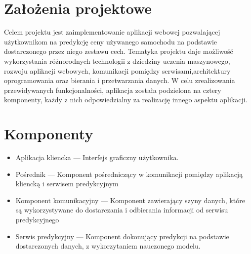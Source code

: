 \documentclass[12pt, a4paper]{report}
\begin{document}
\section{Założenia projektowe}
Celem projektu jest zaimplementowanie aplikacji webowej pozwalającej użytkownikom na predykcję 
ceny używanego samochodu na podstawie dostarczonego przez niego zestawu cech. Tematyka projektu
daje możliwość wykorzystania różnorodnych technologii z dziedziny uczenia maszynowego, rozwoju
aplikacji webowych, komunikacji pomiędzy serwisami,architektury oprogramowania oraz bierania i 
przetwarzania danych. W celu zrealizowania przewidywanych funkcjonalności, aplikacja została
podzielona na cztery komponenty, każdy z nich odpowiedzialny za realizację innego aspektu
aplikacji.
\section{Komponenty}
\begin{itemize}
    \item Aplikacja kliencka --- Interfejs graficzny użytkownika.
    \item Pośrednik --- Komponent pośredniczący w komunikacji pomiędzy aplikacją kliencką i serwisem predykcyjnym
    \item Komponent komunikacyjny --- Komponent zawierający szyny danych, które są wykorzystywane do dostarczania i odbierania informacji od serwisu predykcyjnego
    \item Serwis predykcyjny --- Komponent dokonujący predykcji na podstawie dostarczonych danych, z wykorzytaniem nauczonego modelu.
\end{itemize}
\end{document}
